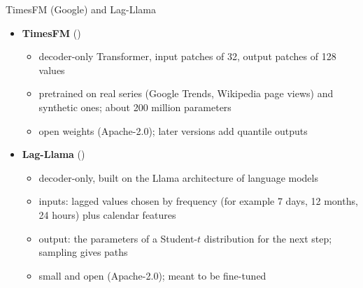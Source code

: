 \begin{frame}{TimesFM (Google) and Lag-Llama}
\itemsize{\footnotesize}
\begin{itemize}
    \item \textbf{TimesFM} ()
    \begin{itemize}
        \item decoder-only Transformer, input patches of 32, output patches of 128 values
        \item pretrained on real series (Google Trends, Wikipedia page views) and synthetic ones; about 200 million parameters
        \item open weights (Apache-2.0); later versions add quantile outputs
    \end{itemize}
    \item \textbf{Lag-Llama} ()
    \begin{itemize}
        \item decoder-only, built on the Llama architecture of language models
        \item inputs: lagged values chosen by frequency (for example 7 days, 12 months, 24 hours) plus calendar features
        \item output: the parameters of a Student-$t$ distribution for the next step; sampling gives paths
        \item small and open (Apache-2.0); meant to be fine-tuned
    \end{itemize}
\end{itemize}
\end{frame}

